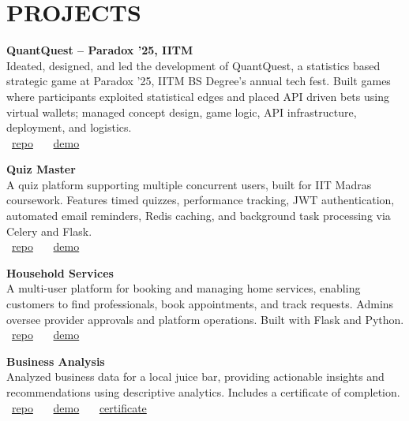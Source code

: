 \documentclass[11pt,a4paper]{article}
\begin{document}
\pagebreak

\section*{PROJECTS}

\textbf{QuantQuest -- Paradox '25, IITM} \\
Ideated, designed, and led the development of QuantQuest, a statistics based strategic game at Paradox '25, IITM BS Degree's annual tech fest. Built games where participants exploited statistical edges and placed API driven bets using virtual wallets; managed concept design, game logic, API infrastructure, deployment, and logistics. \\
\faGithub~\href{https://github.com/21f1006194/quant-quest}{\textcolor{linkgray}{repo}} \, \textbar{} \,
\faPlayCircle~\href{https://youtu.be/zgA83sge67Y?t=1211}{\textcolor{linkgray}{demo}}

\textbf{Quiz Master} \\
A quiz platform supporting multiple concurrent users, built for IIT Madras coursework. Features timed quizzes, performance tracking, JWT authentication, automated email reminders, Redis caching, and background task processing via Celery and Flask. \\
\faGithub~\href{https://github.com/21f1006194/quizmaster}{\textcolor{linkgray}{repo}} \, \textbar{} \,
\faPlayCircle~\href{https://youtu.be/9D6rJ8Ubrwg}{\textcolor{linkgray}{demo}}

\textbf{Household Services} \\
A multi-user platform for booking and managing home services, enabling customers to find professionals, book appointments, and track requests. Admins oversee provider approvals and platform operations. Built with Flask and Python. \\
\faGithub~\href{https://github.com/21f1006194/Household-Services}{\textcolor{linkgray}{repo}} \, \textbar{} \,
\faPlayCircle~\href{https://www.youtube.com/watch?v=FHMdtaLWznI}{\textcolor{linkgray}{demo}}

\textbf{Business Analysis} \\
Analyzed business data for a local juice bar, providing actionable insights and recommendations using descriptive analytics. Includes a certificate of completion. \\
\faGithub~\href{https://github.com/jishnujp/avocado-analysis}{\textcolor{linkgray}{repo}} \, \textbar{} \,
\faPlayCircle~\href{https://www.youtube.com/watch?v=u5RuEhBsXKg}{\textcolor{linkgray}{demo}} \, \textbar{} \,
\faFilePdfO~\href{https://raw.githubusercontent.com/jishnujp/avocado-analysis/main/public/certificate.pdf}{\textcolor{linkgray}{certificate}}
\end{document}
